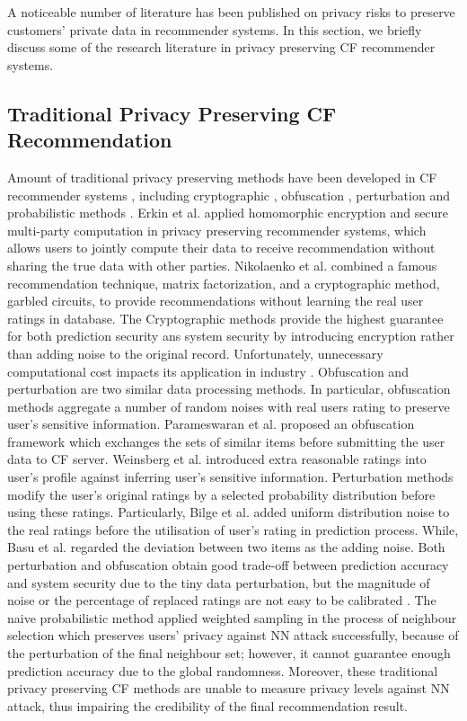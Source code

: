 \documentclass[11pt]{article}
\begin{document}
A noticeable number of literature has been published on privacy risks to preserve customers' private data in recommender systems. In this section, we briefly discuss some of the research literature in privacy preserving CF recommender systems.

\subsection{Traditional Privacy Preserving CF Recommendation}
Amount of traditional privacy preserving methods have been developed in CF recommender systems \cite{ZHU2014}, including cryptographic \cite{ERKIN2010, NIKOLAENKO2013}, obfuscation \cite{PARAMESWARAN2007, WEINSBERG2012}, perturbation \cite{BASU2012, BILGE2012} and probabilistic methods \cite{ADAMOPOULOS2014}. Erkin et al. \cite{ERKIN2010} applied homomorphic encryption and secure multi-party computation in privacy preserving recommender systems, which allows users to jointly compute their data to receive recommendation without sharing the true data with other parties. Nikolaenko et al. \cite{NIKOLAENKO2013} combined a famous recommendation technique, matrix factorization, and a cryptographic method, garbled circuits, to provide recommendations without learning the real user ratings in database. The Cryptographic methods provide the highest guarantee for both prediction security ans system security by introducing encryption rather than adding noise to the original record. Unfortunately, unnecessary computational cost impacts its application in industry \cite{ZHU2014}. Obfuscation and perturbation are two similar data processing methods. In particular, obfuscation methods aggregate a number of random noises with real users rating to preserve user's sensitive information. Parameswaran et al. \cite{PARAMESWARAN2007} proposed an obfuscation framework which exchanges the sets of similar items before submitting the user data to CF server. Weinsberg et al. \cite{WEINSBERG2012} introduced extra reasonable ratings into user's profile against inferring user's sensitive information. Perturbation methods modify the user's original ratings by a selected probability distribution before using these ratings. Particularly, Bilge et al. \cite{BILGE2012} added uniform distribution noise to the real ratings before the utilisation of user's rating in prediction process. While, Basu et al. \cite{BASU2012} regarded the deviation between two items as the adding noise. Both perturbation and obfuscation obtain good trade-off between prediction accuracy and system security due to the tiny data perturbation, but the magnitude of noise or the percentage of replaced ratings are not easy to be calibrated \cite{DWORK2006B, ZHU2014}. The naive probabilistic method \cite{ADAMOPOULOS2014} applied weighted sampling in the process of neighbour selection which preserves users' privacy against NN attack successfully, because of the perturbation of the final neighbour set; however, it cannot guarantee enough prediction accuracy due to the global randomness. Moreover, these traditional privacy preserving CF methods are unable to measure privacy levels against NN attack, thus impairing the credibility of the final recommendation result.
\end{document}
